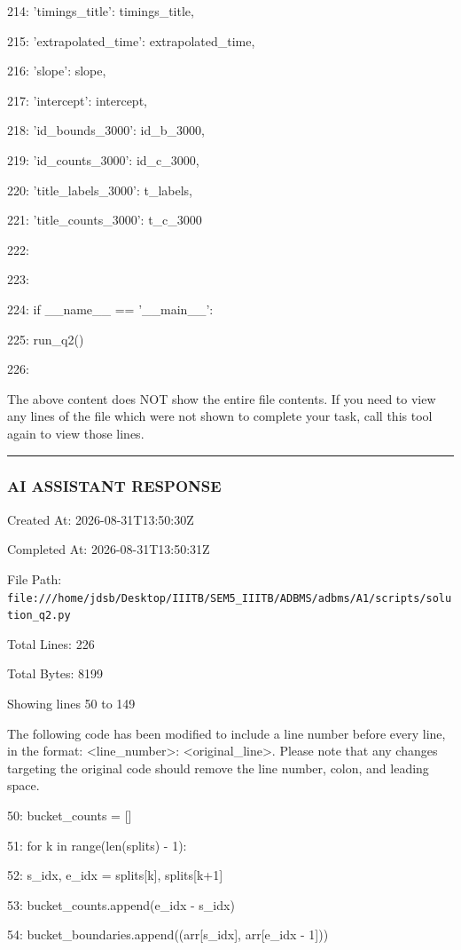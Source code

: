 \documentclass[11pt,a4paper]{article}
\begin{document}
{{{{214:         'timings\_title': timings\_title,

215:         'extrapolated\_time': extrapolated\_time,

216:         'slope': slope,

217:         'intercept': intercept,

218:         'id\_bounds\_3000': id\_b\_3000,

219:         'id\_counts\_3000': id\_c\_3000,

220:         'title\_labels\_3000': t\_labels,

221:         'title\_counts\_3000': t\_c\_3000

222:     }

223:

224: if \_\_name\_\_ == '\_\_main\_\_':

225:     run\_q2()

226:

The above content does NOT show the entire file contents. If you need to view any lines of the file which were not shown to complete your task, call this tool again to view those lines.


\hrule

\subsubsection{AI ASSISTANT RESPONSE}

Created At: 2026-08-31T13:50:30Z

Completed At: 2026-08-31T13:50:31Z

File Path: \texttt{file:///home/jdsb/Desktop/IIITB/SEM5\_IIITB/ADBMS/adbms/A1/scripts/solution\_q2.py}

Total Lines: 226

Total Bytes: 8199

Showing lines 50 to 149

The following code has been modified to include a line number before every line, in the format: <line\_number>: <original\_line>. Please note that any changes targeting the original code should remove the line number, colon, and leading space.

50:     bucket\_counts = []

51:     for k in range(len(splits) - 1):

52:         s\_idx, e\_idx = splits[k], splits[k+1]

53:         bucket\_counts.append(e\_idx - s\_idx)

54:         bucket\_boundaries.append((arr[s\_idx], arr[e\_idx - 1]))

}}}
\end{document}
